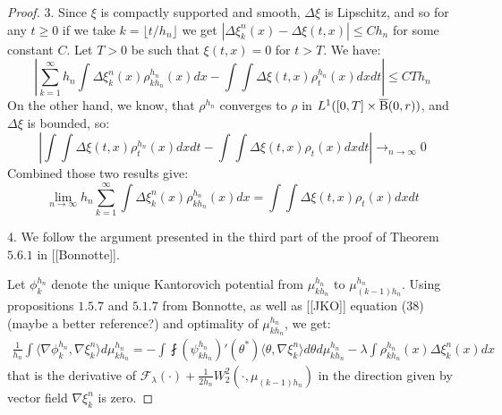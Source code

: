 \begin{proof}
3. Since $\xi$ is compactly supported and smooth, $\Delta \xi$ is Lipschitz, and so for any $ t \geq 0$ if we take $k = \lfloor t/h_n \rfloor$ we get $| \Delta \xi_k^n(x) - \Delta \xi(t,x) | \leq C h_n$ for some constant $C$. Let $T > 0$ be such that $\xi(t,x) = 0 $ for $t > T$. We have:
\[
\left| \sum_{k=1}^{\infty} h_n \int \Delta \xi_k^n(x) \rho_{kh_n}^{h_n}(x) dx - \int \int \Delta \xi(t,x) \rho_{t}^{h_n}(x) dx dt \right| \leq CTh_n 
\]
On the other hand,  we know, that $\rho^{h_n}$ converges to $\rho$ in $L^1([0,T] \times \operatorname{\overline{B}}(0,r))$, and $\Delta \xi$ is bounded, so:
\[
\left| \int \int \Delta \xi(t,x) \rho_{t}^{h_n}(x) dx dt - \int \int \Delta \xi (t,x) \rho_t(x) dx dt \right| \rightarrow_{n \rightarrow \infty} 0
\]
Combined those two results give:
\begin{equation} \label{thm:cont_proof_part3}
\lim_{n \rightarrow \infty} h_n \sum_{k=1}^{\infty} \int \Delta \xi_k^n(x) \rho_{kh_n}^{h_n}(x) dx = \int \int \Delta \xi (t,x) \rho_t(x) dx dt
\end{equation}



4. We follow the argument presented in the third part of the proof of Theorem $5.6.1$ in [[Bonnotte]].

Let $\phi_{k}^{h_n}$ denote the unique Kantorovich potential from $\mu_{kh_n}^{h_n}$ to $\mu_{(k-1)h_n}^{h_n}$. Using propositions $1.5.7$ and $5.1.7$ from Bonnotte, as well as [[JKO]] equation (38) (maybe a better reference?) and optimality of $\mu_{kh_n}^{h_n}$, we get:
\begin{multline} \label{thm:cont_proof_eq0}
\frac{1}{h_n} \int \langle \nabla \phi_k^{h_n} , \nabla \xi_{k}^n \rangle d\mu_{kh_n}^{h_n} =  - \int \fint (\psi_{kh_n}^{h_n})'(\theta^{*}) \langle \theta, \nabla \xi_k^n \rangle d\theta d\mu_{kh_n}^{h_n} - \lambda \int  \rho_{kh_n}^{h_n}(x) \Delta \xi_k^n(x)  dx 
\end{multline}
that is the derivative of $\mathcal{F}_{\lambda}(\cdot) + \frac{1}{2h_n}W_2^2(\cdot, \mu_{(k-1)h_n})$ in the direction given by vector field $\nabla \xi_k^n$ is zero.


\end{proof}
